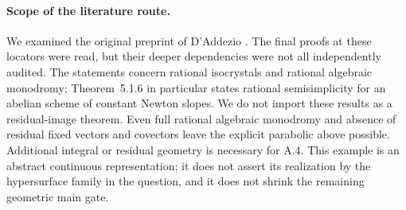 \paragraph{Scope of the literature route.}
We examined the original preprint of D'Addezio
\cite[Theorem~4.4.12, printed pp.~23--24;
Proposition~5.1.4 and Theorem~5.1.6, printed p.~25]
{DAddezio2023Parabolicity}. The final proofs at these locators were
read, but their deeper dependencies were not all independently
audited. The statements concern rational isocrystals and rational
algebraic monodromy; Theorem~5.1.6 in particular states rational
semisimplicity for an abelian scheme of constant Newton slopes.
We do not import these results as a residual-image theorem. Even
full rational algebraic monodromy and absence of residual fixed
vectors and covectors leave the explicit parabolic above possible.
Additional integral or residual geometry is necessary for A.4.
This example is an abstract continuous representation; it does not
assert its realization by the hypersurface family in the question,
and it does not shrink the remaining geometric main gate.

